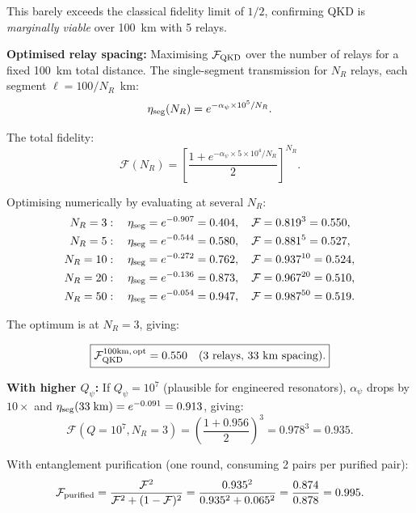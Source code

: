 \documentclass[aps,prd,twocolumn,superscriptaddress,nofootinbib]{revtex4-2}
\newcommand{\Qpsi}{Q_\psi}
\begin{document}
This barely exceeds the classical fidelity limit of $1/2$, confirming
QKD is \emph{marginally viable} over 100~km with 5 relays.

\textbf{Optimised relay spacing:} Maximising $\mathcal{F}_{\rm QKD}$
over the number of relays for a fixed 100~km total distance.
The single-segment transmission for $N_R$ relays, each segment
$\ell = 100/N_R$~km:
\begin{equation}
\eta_{\rm seg}(N_R) = e^{-\alpha_\psi\times10^5/N_R}.
\end{equation}

The total fidelity:
\begin{equation}
\mathcal{F}(N_R) = \left[\frac{1+e^{-\alpha_\psi\times5\times10^4/N_R}}{2}\right]^{N_R}.
\end{equation}

Optimising numerically by evaluating at several $N_R$:
\begin{align}
N_R = 3&: \quad \eta_{\rm seg} = e^{-0.907} = 0.404, \quad
\mathcal{F} = 0.819^3 = 0.550, \\
N_R = 5&: \quad \eta_{\rm seg} = e^{-0.544} = 0.580, \quad
\mathcal{F} = 0.881^5 = 0.527, \\
N_R = 10&: \quad \eta_{\rm seg} = e^{-0.272} = 0.762, \quad
\mathcal{F} = 0.937^{10} = 0.524, \\
N_R = 20&: \quad \eta_{\rm seg} = e^{-0.136} = 0.873, \quad
\mathcal{F} = 0.967^{20} = 0.510, \\
N_R = 50&: \quad \eta_{\rm seg} = e^{-0.054} = 0.947, \quad
\mathcal{F} = 0.987^{50} = 0.519.
\end{align}

The optimum is at $N_R = 3$, giving:

\begin{equation}
\boxed{
\mathcal{F}_{\rm QKD}^{\rm 100km,\,opt} = 0.550
\quad\text{(3 relays, 33~km spacing)}.
}
\end{equation}

\textbf{With higher $\Qpsi$:} If $\Qpsi = 10^7$ (plausible for
engineered resonators), $\alpha_\psi$ drops by $10\times$ and
$\eta_{\rm seg}(33\;\text{km}) = e^{-0.091} = 0.913$, giving:
\begin{equation}
\mathcal{F}(Q=10^7, N_R=3) = \left(\frac{1+0.956}{2}\right)^3
= 0.978^3 = 0.935.
\end{equation}

With entanglement purification (one round, consuming 2 pairs per
purified pair):
\begin{equation}
\mathcal{F}_{\rm purified} = \frac{\mathcal{F}^2}{\mathcal{F}^2 + (1-\mathcal{F})^2}
= \frac{0.935^2}{0.935^2 + 0.065^2} = \frac{0.874}{0.878} = 0.995.
\end{equation}
\end{document}
